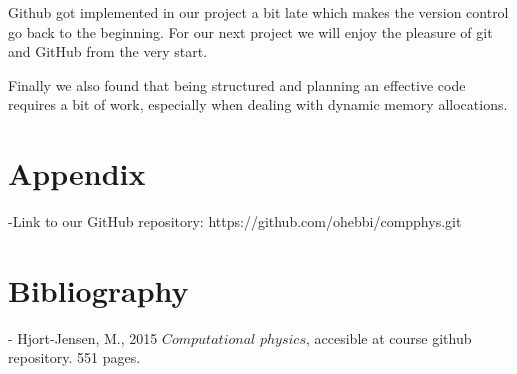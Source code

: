 \documentclass[%
oneside,                 %
final,                   %
10pt]{article}
\begin{document}
Github got implemented in our project a bit late which makes the version control go back to the beginning. For our next project we will enjoy the pleasure of git and GitHub from the very start.

Finally we also found that being structured and planning an effective code requires a bit of work, especially when dealing with dynamic memory allocations. 

\section{Appendix}

-Link to our GitHub repository:
https://github.com/ohebbi/compphys.git

\section{Bibliography}

- Hjort-Jensen, M., 2015 $Computational$ $physics$, accesible at course github repository. 551 pages.
\end{document}
